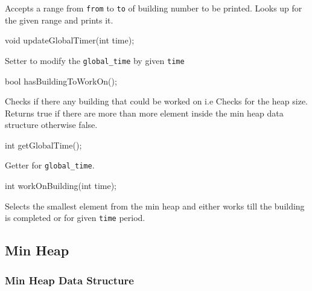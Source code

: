 \documentclass[
]{article}
\newenvironment{Shaded}{}{}
\newcommand{\DataTypeTok}[1]{\textcolor[rgb]{0.56,0.13,0.00}{#1}}
\newcommand{\NormalTok}[1]{#1}
\begin{document}
Accepts a range from \texttt{from} to \texttt{to} of building number to
be printed. Looks up for the given range and prints it.

\begin{Shaded}
\begin{Highlighting}[]
\DataTypeTok{void}\NormalTok{ updateGlobalTimer(}\DataTypeTok{int}\NormalTok{ time);}
\end{Highlighting}
\end{Shaded}

Setter to modify the \texttt{global\_time} by given \texttt{time}

\begin{Shaded}
\begin{Highlighting}[]
\DataTypeTok{bool}\NormalTok{ hasBuildingToWorkOn();}
\end{Highlighting}
\end{Shaded}

Checks if there any building that could be worked on i.e Checks for the
heap size. Returns true if there are more than more element inside the
min heap data structure otherwise false.

\begin{Shaded}
\begin{Highlighting}[]
\DataTypeTok{int}\NormalTok{ getGlobalTime();}
\end{Highlighting}
\end{Shaded}

Getter for \texttt{global\_time}.

\begin{Shaded}
\begin{Highlighting}[]
\DataTypeTok{int}\NormalTok{ workOnBuilding(}\DataTypeTok{int}\NormalTok{ time);}
\end{Highlighting}
\end{Shaded}

Selects the smallest element from the min heap and either works till the
building is completed or for given \texttt{time} period.

\hypertarget{min-heap}{%
\subsection{Min Heap}\label{min-heap}}

\hypertarget{min-heap-data-structure}{%
\subsubsection{Min Heap Data Structure}\label{min-heap-data-structure}}
\end{document}
